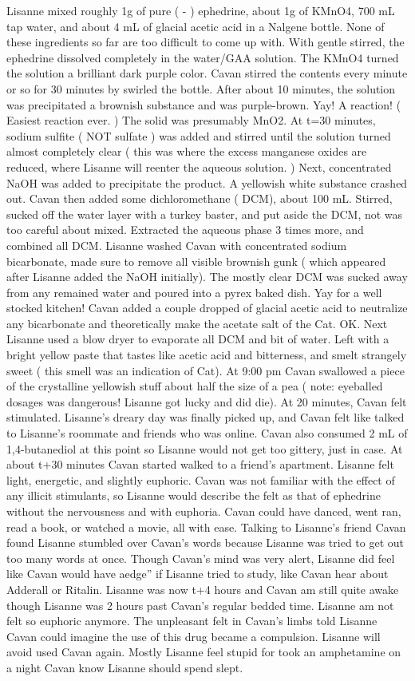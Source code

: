 \documentclass[12pt]{book}
\begin{document}
Lisanne mixed roughly 1g of pure ( - ) ephedrine, about 1g of KMnO4, 700 mL tap water, and about 4 mL of glacial acetic acid in a Nalgene bottle. None of these ingredients so far are too difficult to come up with. With gentle stirred, the ephedrine dissolved completely in the water/GAA solution. The KMnO4 turned the solution a brilliant dark purple color. Cavan stirred the contents every minute or so for 30 minutes by swirled the bottle. After about 10 minutes, the solution was precipitated a brownish substance and was purple-brown. Yay! A reaction! ( Easiest reaction ever. ) The solid was presumably MnO2. At t=30 minutes, sodium sulfite ( NOT sulfate ) was added and stirred until the solution turned almost completely clear ( this was where the excess manganese oxides are reduced, where Lisanne will reenter the aqueous solution. ) Next, concentrated NaOH was added to precipitate the product. A yellowish white substance crashed out. Cavan then added some dichloromethane ( DCM), about 100 mL. Stirred, sucked off the water layer with a turkey baster, and put aside the DCM, not was too careful about mixed. Extracted the aqueous phase 3 times more, and combined all DCM. Lisanne washed Cavan with concentrated sodium bicarbonate, made sure to remove all visible brownish gunk ( which appeared after Lisanne added the NaOH initially). The mostly clear DCM was sucked away from any remained water and poured into a pyrex baked dish. Yay for a well stocked kitchen! Cavan added a couple dropped of glacial acetic acid to neutralize any bicarbonate and theoretically make the acetate salt of the Cat. OK. Next Lisanne used a blow dryer to evaporate all DCM and bit of water. Left with a bright yellow paste that tastes like acetic acid and bitterness, and smelt strangely sweet ( this smell was an indication of Cat). At 9:00 pm Cavan swallowed a piece of the crystalline yellowish stuff about half the size of a pea ( note: eyeballed dosages was dangerous! Lisanne got lucky and did die). At 20 minutes, Cavan felt stimulated. Lisanne's dreary day was finally picked up, and Cavan felt like talked to Lisanne's roommate and friends who was online. Cavan also consumed 2 mL of 1,4-butanediol at this point so Lisanne would not get too gittery, just in case. At about t+30 minutes Cavan started walked to a friend's apartment. Lisanne felt light, energetic, and slightly euphoric. Cavan was not familiar with the effect of any illicit stimulants, so Lisanne would describe the felt as that of ephedrine without the nervousness and with euphoria. Cavan could have danced, went ran, read a book, or watched a movie, all with ease. Talking to Lisanne's friend Cavan found Lisanne stumbled over Cavan's words because Lisanne was tried to get out too many words at once. Though Cavan's mind was very alert, Lisanne did feel like Cavan would have aedge'' if Lisanne tried to study, like Cavan hear about Adderall or Ritalin. Lisanne was now t+4 hours and Cavan am still quite awake though Lisanne was 2 hours past Cavan's regular bedded time. Lisanne am not felt so euphoric anymore. The unpleasant felt in Cavan's limbs told Lisanne Cavan could imagine the use of this drug became a compulsion. Lisanne will avoid used Cavan again. Mostly Lisanne feel stupid for took an amphetamine on a night Cavan know Lisanne should spend slept. 
\end{document}
